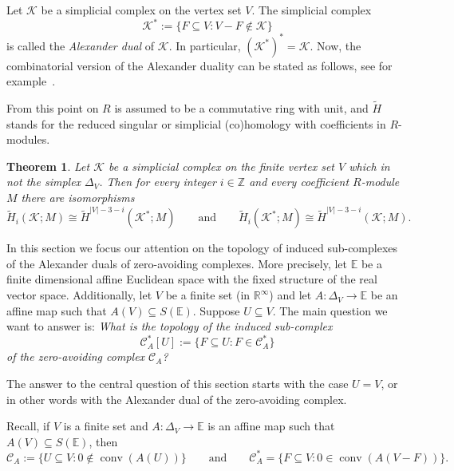 \documentclass[a4paper,11pt,reqno, english]{amsart}
\newtheorem{theorem}{Theorem}[section]
\theoremstyle{definition}
\theoremstyle{remark}
\newcommand\R{\mathbb R}
\newcommand\Z{\mathbb Z}
\newcommand\CC{\mathscr C}
\newcommand\E{\mathbb{E}}
\newcommand\K{\mathscr{K}}
\DeclareMathOperator{\conv}{\mathrm{conv}}
\begin{document}
\medskip
Let $\K$ be a simplicial complex on the vertex set $V$.
The simplicial complex
\[
	\K^*:= \{ F\subseteq V :V-F \notin\K\}
\]
is called the {\em Alexander dual} of $\K$.
In particular, $(\K^*)^*=\K$.
Now, the combinatorial version of the Alexander duality can be stated as follows, see for example~\cite[Thm.\,1.1]{BjornerTancer2009}.

\medskip
From this point on $R$ is assumed to be a commutative ring with unit, and $\widetilde{H}$ stands for the reduced singular or simplicial (co)homology with coefficients in $R$-modules.

\medskip
\begin{theorem}
	\label{th : combinatorial Alexander duality}
	Let $\K$ be a simplicial complex on the finite vertex set $V$ which in not the simplex $\Delta_V$.
	Then for every integer $i\in\Z$ and every coefficient $R$-module $M$ there are isomorphisms
	\begin{equation}
		\label{iso : Alexander 01}
		\widetilde{H}_i(\K;M)\cong  \widetilde{H}^{|V|-3-i}(\K^*;M)
		\qquad\text{and}\qquad
		\widetilde{H}_i(\K^*;M)\cong  \widetilde{H}^{|V|-3-i}(\K;M).
	\end{equation}
\end{theorem}


\medskip
In this section we focus our attention on the topology of induced sub-complexes of the Alexander duals of zero-avoiding complexes.
More precisely, let $\E$ be a finite dimensional affine Euclidean space with the fixed structure of the real vector space.
Additionally, let $V$ be a finite set (in $\R^{\infty}$) and let $A\colon \Delta_V\longrightarrow\E$ be an affine map such that $A(V)\subseteq S(\E)$.
Suppose $U\subseteq V$.
The main question we want to answer is: {\em What is the topology of the induced sub-complex
\[
	\CC_A^*[U]:=\{F\subseteq U : F\in \CC_A^*\}
\]
of the zero-avoiding complex $\CC_A$? }



\medskip
The answer to the central question of this section starts with the case  $U=V$, or in other words with the Alexander dual of the zero-avoiding complex.



\medskip
Recall, if $V$ is a finite set and $A\colon \Delta_V\longrightarrow\E$ is an affine map such that $A(V)\subseteq S(\E)$, then
\begin{equation}
	\label{eq : dual}
	\CC_A:=\{U\subseteq V : 0\notin \conv(A(U))\}
	\qquad\text{and}\qquad
	\CC_A^*=   \{ F\subseteq V : 0\in \conv(A(V-F)) \}.
\end{equation}
\end{document}
